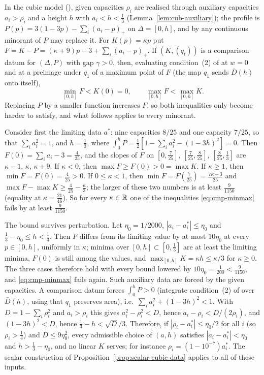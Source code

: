 \begin{remark}\label{rem:cmp-linear-fails}
In the cubic model (), given capacities $\rho_i$ are realised through auxiliary capacities
$a_i>\rho_i$ and a height $h$ with $a_i<h<\frac13$ (Lemma~\ref{lem:cub-auxiliary}); the profile is
$P(p)=3(1-3p)-\sum_i(a_i-p)_+$ on $\Delta=[0,h]$, and by  any continuous minorant of $P$
may replace it. For $K(p)=\kappa p$ put $F=K-P=(\kappa+9)p-3+\sum_i(a_i-p)_+$. If $(K,(q_t))$ is a comparison datum for
$(\Delta,P)$ with gap $\gamma>0$, then, evaluating condition~(2) of  at $w=0$ and at a
preimage under $q_1$ of a maximum point of $F$ (the map $q_1$ sends $\bar D(h)$ onto itself),
\begin{equation}\label{eq:cmp-minmax}
 \min_{[0,h]}F<K(0)=0,\qquad \max_{[0,h]}F<\max_{[0,h]}K .
\end{equation}
Replacing $P$ by a smaller function increases $F$, so both inequalities only become harder to satisfy, and what
follows applies to every minorant.

Consider first the limiting data $a^*$: nine capacities $8/25$ and one capacity $7/25$, so that $\sum_ia_i^2=1$, and
$h=\frac13$, where $\int_0^hP=\frac12[1-\sum_ia_i^2-(1-3h)^2]=0$. Then $F(0)=\sum_ia_i-3=\frac4{25}$, and the slopes of
$F$ on $[0,\frac7{25}]$, $[\frac7{25},\frac8{25}]$, $[\frac8{25},\frac13]$ are $\kappa-1$, $\kappa$, $\kappa+9$. If
$\kappa<0$, then $\max F\ge F(0)>0=\max K$. If $\kappa\ge1$, then $\min F=F(0)=\frac4{25}>0$. If $0\le\kappa<1$, then
$\min F=F(\frac7{25})=\frac{7\kappa-3}{25}$ and $\max F-\max K\ge\frac4{25}-\frac\kappa3$; the larger of these two
numbers is at least $\frac9{1150}$ (equality at $\kappa=\frac{21}{46}$). So for every $\kappa\in\mathbb{R}$ one of the
inequalities \eqref{eq:cmp-minmax} fails by at least $\frac9{1150}$.

The bound survives perturbation. Let $\eta_0=1/2000$, $|a_i-a^*_i|\le\eta_0$ and $\frac13-\eta_0\le h<\frac13$. Then
$F$ differs from its limiting value by at most $10\eta_0$ at every $p\in[0,h]$, uniformly in $\kappa$; minima over
$[0,h]\subset[0,\frac13]$ are at least the limiting minima, $F(0)$ is still among the values, and
$\max_{[0,h]}K=\kappa h\le\kappa/3$ for $\kappa\ge0$. The three cases therefore hold with every bound lowered by
$10\eta_0=\frac1{200}<\frac9{1150}$, and \eqref{eq:cmp-minmax} fails again. Such auxiliary data are forced by the
given capacities. A comparison datum forces $\int_0^hP>0$ (integrate condition~(2) of  over $\bar D(h)$, using that
$q_1$ preserves area), i.e.\ $\sum_ia_i^2+(1-3h)^2<1$. With $D=1-\sum_i\rho_i^2$ and $a_i>\rho_i$ this gives
$a_i^2-\rho_i^2<D$, hence $a_i-\rho_i<D/(2\rho_i)$, and $(1-3h)^2<D$, hence $\frac13-h<\sqrt D/3$. Therefore, if
$|\rho_i-a^*_i|\le\eta_0/2$ for all $i$ (so $\rho_i>\frac14$) and $D\le9\eta_0^2$, every admissible choice of $(a,h)$
satisfies $|a_i-a^*_i|<\eta_0$ and $h>\frac13-\eta_0$, and no linear $K$ serves; for instance
$\rho_i=(1-10^{-7})a^*_i$. The scalar construction of Proposition~\ref{prop:scalar-cubic-data} applies to all of these inputs.
\end{remark}
